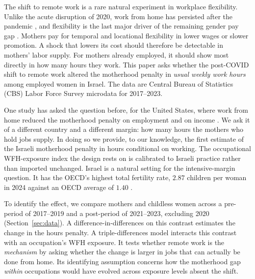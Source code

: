 \documentclass[12pt,a4paper]{article}
\begin{document}
The shift to remote work is a rare natural experiment in workplace flexibility. Unlike the acute
disruption of 2020, work from home has persisted after the pandemic \citep{barrero2021}, and
flexibility is the last major driver of the remaining gender pay gap \citep{goldin2014}. Mothers
pay for temporal and locational flexibility in lower wages or slower promotion. A shock that
lowers its cost should therefore be detectable in mothers' labor supply. For mothers already
employed, it should show most directly in how many hours they work. This paper asks whether the post-COVID shift to remote
work altered the motherhood penalty in \emph{usual weekly work hours} among employed women in
Israel. The data are Central Bureau of Statistics (CBS) Labor Force Survey microdata for
2017--2023.

\noindent One study has asked the question before, for the United States, where work from home reduced the
motherhood penalty on employment and on income \citep{harrington2025}. We ask it of a different
country and a different margin: how many hours the mothers who hold jobs supply. In doing so we
provide, to our knowledge, the first estimate of the Israeli motherhood penalty in hours
conditional on working. The occupational WFH-exposure index the design rests on is calibrated to
Israeli practice rather than imported unchanged. Israel is a natural setting for the intensive-margin question. It
has the OECD's highest total fertility rate, $2.87$ children per woman in 2024 against an OECD
average of $1.40$ \citep{oecd2025fertility}.

\noindent To identify the effect, we compare mothers and childless women across a pre-period of 2017--2019
and a post-period of 2021--2023, excluding 2020 (Section~\ref{sec:data}). A
difference-in-differences on this contrast estimates the change in the hours penalty. A
triple-differences model interacts this contrast with an occupation's WFH exposure. It tests
whether remote work is the \emph{mechanism} by asking whether the change is larger in jobs that
can actually be done from home. Its identifying assumption concerns how the motherhood gap \emph{within}
occupations would have evolved across exposure levels absent the shift.
\end{document}
